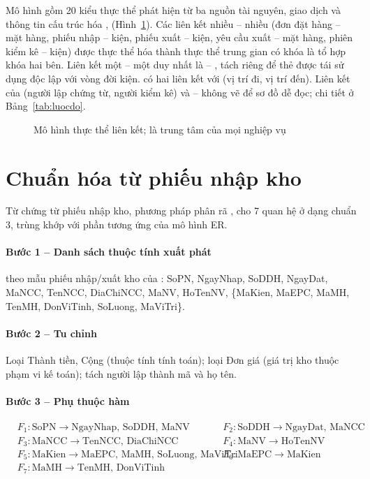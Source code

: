 Mô hình gồm 20 kiểu thực thể phát hiện từ ba nguồn tài nguyên, giao dịch và thông tin cấu trúc hóa \cite[Ch.~6]{tung_qlhttt}, \cite{chen1976} (Hình~\ref{fig:er}). Các liên kết nhiều -- nhiều (đơn đặt hàng -- mặt hàng, phiếu nhập -- kiện, phiếu xuất -- kiện, yêu cầu xuất -- mặt hàng, phiên kiểm kê -- kiện) được thực thể hóa thành thực thể trung gian có khóa là tổ hợp khóa hai bên. Liên kết một -- một duy nhất là  -- , tách riêng để thẻ được tái sử dụng độc lập với vòng đời kiện.  có hai liên kết với  (vị trí đi, vị trí đến). Liên kết của  (người lập chứng từ, người kiểm kê) và  --  không vẽ để sơ đồ dễ đọc; chi tiết ở Bảng~\ref{tab:luocdo}.

\begin{figure}[H]
\centering
{}
\caption{Mô hình thực thể liên kết;  là trung tâm của mọi nghiệp vụ}
\label{fig:er}
\end{figure}

\section{Chuẩn hóa từ phiếu nhập kho}
\label{sec:chuanhoa}

Từ chứng từ phiếu nhập kho, phương pháp phân rã \cite[Ch.~6]{tung_qlhttt}, \cite{codd1970} cho 7 quan hệ ở dạng chuẩn 3, trùng khớp với phần tương ứng của mô hình ER.

\paragraph{Bước 1 -- Danh sách thuộc tính xuất phát} theo mẫu phiếu nhập/xuất kho của \cite[Ch.~6]{tung_qlhttt}: SoPN, NgayNhap, SoDDH, NgayDat, MaNCC, TenNCC, DiaChiNCC, MaNV, HoTenNV, \{MaKien, MaEPC, MaMH, TenMH, DonViTinh, SoLuong, MaViTri\}.

\paragraph{Bước 2 -- Tu chỉnh} Loại Thành tiền, Cộng (thuộc tính tính toán); loại Đơn giá (giá trị kho thuộc phạm vi kế toán); tách người lập thành mã và họ tên.

\paragraph{Bước 3 -- Phụ thuộc hàm}
\begin{align*}
&F_1: \text{SoPN} \to \text{NgayNhap, SoDDH, MaNV} &
&F_2: \text{SoDDH} \to \text{NgayDat, MaNCC} \\
&F_3: \text{MaNCC} \to \text{TenNCC, DiaChiNCC} &
&F_4: \text{MaNV} \to \text{HoTenNV} \\
&F_5: \text{MaKien} \to \text{MaEPC, MaMH, SoLuong, MaViTri} &
&F_6: \text{MaEPC} \to \text{MaKien} \\
&F_7: \text{MaMH} \to \text{TenMH, DonViTinh}
\end{align*}

